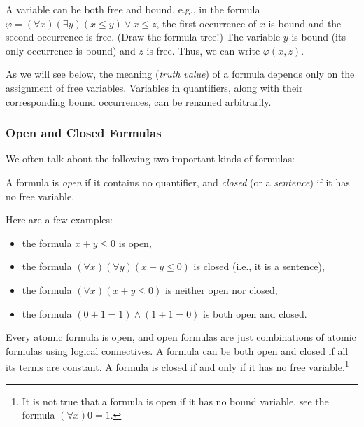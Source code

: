 \begin{example}
    A variable can be both free and bound, e.g., in the formula $\varphi=(\forall x)(\exists y)(x\leq y)\lor x\leq z$, the first occurrence of $x$ is bound and the second occurrence is free. (Draw the formula tree!) The variable $y$ is bound (its only occurrence is bound) and $z$ is free. Thus, we can write $\varphi(x,z)$.
\end{example}

\begin{remark}
    As we will see below, the meaning (\emph{truth value}) of a formula depends only on the assignment of free variables. Variables in quantifiers, along with their corresponding bound occurrences, can be renamed arbitrarily.
\end{remark}


\subsubsection{Open and Closed Formulas}

We often talk about the following two important kinds of formulas:

\begin{definition}
A formula is \emph{open} if it contains no quantifier, and \emph{closed} (or a \emph{sentence}) if it has no free variable.
\end{definition}

\begin{example} Here are a few examples:
    \begin{itemize}
        \item the formula $x+y\leq 0$ is open,
        \item the formula $(\forall x)(\forall y)(x+y\leq 0)$ is closed (i.e., it is a sentence),
        \item the formula $(\forall x)(x+y\leq 0)$ is neither open nor closed,
        \item the formula $(0+1=1)\land (1+1=0)$ is both open and closed.
    \end{itemize}
\end{example}

Every atomic formula is open, and open formulas are just combinations of atomic formulas using logical connectives. A formula can be both open and closed if all its terms are constant. A formula is closed if and only if it has no free variable.\footnote{It is not true that a formula is open if it has no bound variable, see the formula $(\forall x)0=1$.}


